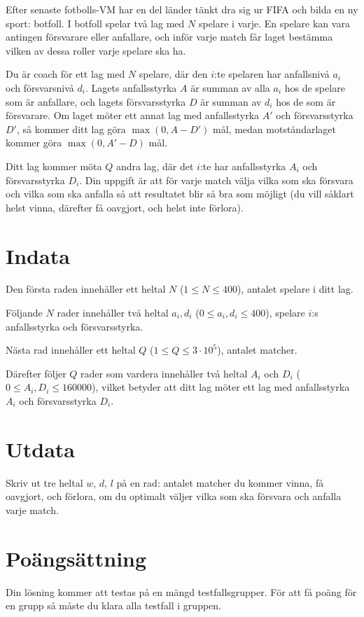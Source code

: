 
Efter senaste fotbolls-VM har en del länder tänkt dra sig ur FIFA och bilda en ny sport: botfoll. 
I botfoll spelar två lag med $N$ spelare i varje. En spelare kan vara antingen försvarare eller anfallare, 
och inför varje match får laget bestämma vilken av dessa roller varje spelare ska ha.

Du är coach för ett lag med $N$ spelare, där den $i$:te spelaren har anfallsnivå $a_i$ och försvarsnivå $d_i$. 
Lagets anfallsstyrka $A$ är summan av alla $a_i$ hos de spelare som är anfallare, 
och lagets försvarsstyrka $D$ är summan av $d_i$ hos de som är försvarare. 
Om laget möter ett annat lag med anfallsstyrka $A'$ och försvarsstyrka $D'$, 
så kommer ditt lag göra $\max(0, A-D')$ mål, medan motståndarlaget kommer göra $\max(0, A'-D)$ mål.

Ditt lag kommer möta $Q$ andra lag, där det $i$:te har anfallsstyrka $A_i$ och försvarsstyrka $D_i$. 
Din uppgift är att för varje match välja vilka som ska försvara och vilka som ska anfalla så att resultatet
blir så bra som möjligt (du vill såklart helst vinna, därefter få oavgjort, och helst inte förlora).


\section*{Indata}
Den första raden innehåller ett heltal $N$ ($1 \leq N \leq 400$), antalet spelare i ditt lag.

Följande $N$ rader innehåller två heltal $a_i, d_i$ ($0 \leq a_i, d_i \leq 400$), spelare $i$:s anfallsstyrka
och försvarsstyrka.

Nästa rad innehåller ett heltal $Q$ ($1 \leq Q \leq 3 \cdot 10^5$), antalet matcher.

Därefter följer $Q$ rader som vardera innehåller två heltal $A_i$ och $D_i$ ($0 \leq A_i, D_i \leq 160000$),
vilket betyder att ditt lag möter ett lag med anfallsstyrka $A_i$ och försvarsstyrka $D_i$.

\section*{Utdata}

Skriv ut tre heltal $w$, $d$, $l$ på en rad: antalet matcher du kommer vinna, få oavgjort, och förlora, om 
du optimalt väljer vilka som ska försvara och anfalla varje match.

\section*{Poängsättning}
Din lösning kommer att testas på en mängd testfallsgrupper.
För att få poäng för en grupp så måste du klara alla testfall i gruppen.

